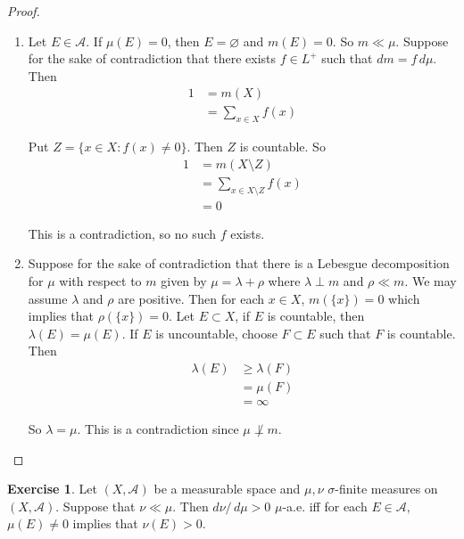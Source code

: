 \documentclass[12pt]{amsart}
\theoremstyle{definition}
\newtheorem{ex}[definition]{Exercise}
\newcommand{\lam}{\lambda}
\newcommand{\sig}{\sigma}
\newcommand{\MA}{\mathcal{A}}
\newcommand{\dmu}{\, d \mu}
\begin{document}
	\begin{proof}
		\begin{enumerate}
			\item Let $E \in \MA$. If $\mu(E) = 0$, then $E = \varnothing$ and $m(E) = 0$. So $m \ll \mu$. Suppose for the sake of contradiction that there exists $f \in L^+$ such that $dm = f \dmu$. Then 
			\begin{align*}
				1
				&= m(X) \\
				&= \sum_{x \in X} f(x)
			\end{align*}
			
			Put $Z = \{x \in X: f(x) \neq 0 \}$. Then $Z$ is countable. So 
			\begin{align*}
				1
				&= m(X \setminus Z) \\
				&= \sum_{x \in X \setminus Z} f(x)\\
				&= 0
			\end{align*}
			
			This is a contradiction, so no such $f$ exists.
			
			\item Suppose for the sake of contradiction that there is a Lebesgue decomposition for $\mu$ with respect to $m$ given by $\mu = \lam + \rho$ where $\lam \perp m$ and $\rho \ll m$. We may assume $\lam$ and $\rho$ are positive. Then for each $x \in X$, $m(\{x\})=0$ which implies that $\rho(\{x\}) = 0$. Let $E \subset X$, if $E$ is countable, then $\lam(E) = \mu(E)$. If $E$ is uncountable, choose $F \subset E$ such that $F$ is countable. Then 
			\begin{align*}
				\lam(E) 
				& \geq \lam(F) \\
				& = \mu(F) \\
				&= \infty
			\end{align*}
			
			So $\lam = \mu$. This is a contradiction since $\mu \not \perp m$.
		\end{enumerate}
	\end{proof}
	
	\begin{ex}
		Let $(X, \MA)$ be a measurable space and $\mu, \nu$ $\sig$-finite measures on $(X, \MA)$. Suppose that $\nu \ll \mu$. Then $d\nu / \dmu > 0$ $\mu$-a.e. iff for each $E \in \MA$, $\mu(E) \neq 0$ implies that $\nu(E) > 0$. 
	\end{ex}
\end{document}
